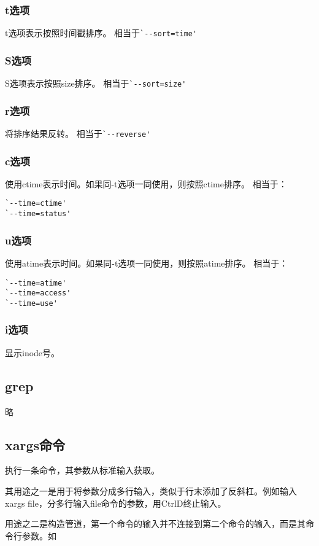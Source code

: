 \subsubsection{t选项}
t选项表示按照时间戳排序。
相当于\verb|`--sort=time'|
\subsubsection{S选项}
S选项表示按照size排序。
相当于\verb|`--sort=size'|
\subsubsection{r选项}
将排序结果反转。
相当于\verb|`--reverse'|
\subsubsection{c选项}
使用ctime表示时间。如果同-t选项一同使用，则按照ctime排序。
相当于：
\begin{verbatim}
`--time=ctime'
`--time=status'
\end{verbatim}

\subsubsection{u选项}
使用atime表示时间。如果同-t选项一同使用，则按照atime排序。
相当于：
\begin{verbatim}
`--time=atime'
`--time=access'
`--time=use'
\end{verbatim}

\subsubsection{i选项}
显示inode号。

\subsection{grep}

略


\subsection{xargs命令}
执行一条命令，其参数从标准输入获取。

其用途之一是用于将参数分成多行输入，类似于行末添加了反斜杠。例如输入xargs file，分多行输入file命令的参数，用CtrlD终止输入。

用途之二是构造管道，第一个命令的输入并不连接到第二个命令的输入，而是其命令行参数。如

